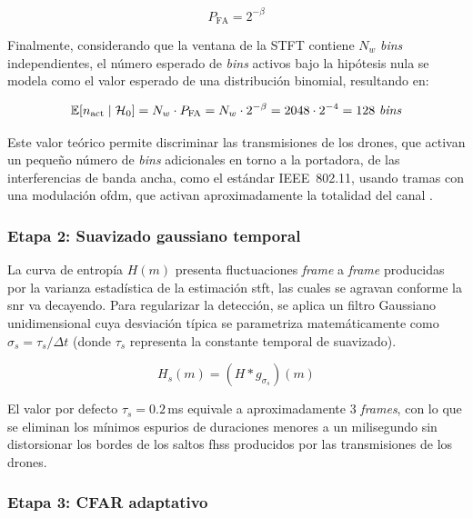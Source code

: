 \begin{equation}
    P_{\text{FA}} = 2^{-\beta}
\end{equation}

Finalmente, considerando que la ventana de la STFT contiene $N_w$ \textit{bins} independientes, el número esperado de \textit{bins} activos bajo la hipótesis nula se modela como el valor esperado de una distribución binomial, resultando en:

\begin{equation}
    \mathbb{E}\!\left[n_{\text{act}} \mid \mathcal{H}_0\right] = N_w \cdot P_{\text{FA}} = N_w \cdot 2^{-\beta} = 2048 \cdot 2^{-4} = 128 \text{ \textit{bins}}
    \label{eq:bins_activos_ruido}
\end{equation}

Este valor teórico permite discriminar las transmisiones de los drones, que activan un pequeño número de \textit{bins} adicionales en torno a la portadora, de las interferencias de banda ancha, como el estándar IEEE~802.11, usando tramas con una modulación \gls{ofdm}, que activan aproximadamente la totalidad del canal \cite{ezuma_detection_2020}.

\subsubsection{Etapa 2: Suavizado gaussiano temporal}

La curva de entropía $H(m)$ presenta fluctuaciones \textit{frame} a \textit{frame} producidas por la varianza estadística de la estimación \gls{stft}, las cuales se agravan conforme la \gls{snr} va decayendo. Para regularizar la detección, se aplica un filtro Gaussiano unidimensional cuya desviación típica se parametriza matemáticamente como $\sigma_s = \tau_s / \Delta t$ (donde $\tau_s$ representa la constante temporal de suavizado).

\begin{equation}
    H_s(m) = \left(H * g_{\sigma_s}\right)(m)
    \label{eq:suavizado}
\end{equation}

El valor por defecto $\tau_s = 0.2$\,ms equivale a aproximadamente 3 \textit{frames}, con lo que se eliminan los mínimos espurios de duraciones menores a un milisegundo sin distorsionar los bordes de los saltos \gls{fhss} producidos por las transmisiones de los drones.

\subsubsection{Etapa 3: CFAR adaptativo}

